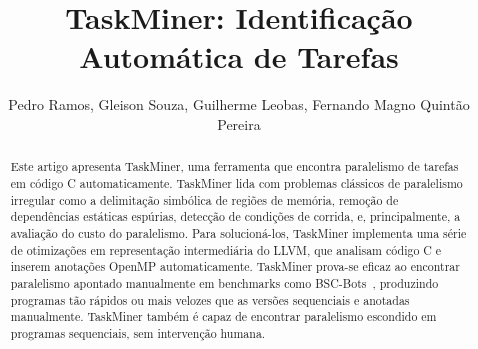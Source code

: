 \documentclass[sigplan,10pt]{acmart}
\newcommand\Taskminer{\mbox{\textsf{TaskMiner}}}
\begin{document}
\title[TaskMiner: Identifica\c{c}\~{a}o Autom\'{a}tica de Tarefas]
{TaskMiner: Identificação Automática de Tarefas}



\author{Pedro Ramos, Gleison Souza, Guilherme Leobas, Fernando Magno Quint\~{a}o Pereira}




\begin{abstract}
Este artigo apresenta \Taskminer{}, uma ferramenta que encontra paralelismo de tarefas
em código C automaticamente. \Taskminer{} lida com problemas clássicos de paralelismo irregular 
como a delimitação simbólica de regiões de memória, remoção de dependências
estáticas espúrias, detecção de condições de corrida, e, principalmente, a avaliação do custo do paralelismo. Para solucioná-los,
\Taskminer{} implementa uma série de otimizações em representa\-ção intermediária do LLVM, que analisam código C e inserem anotações OpenMP automaticamente. \Taskminer{} prova-se eficaz ao encontrar paralelismo apontado manualmente em benchmarks como \textsf{BSC-Bots}~\cite{Duran09}, produzindo programas tão rápidos ou mais velozes que as versões sequenciais e anotadas manualmente. \Taskminer{} também é capaz de encontrar paralelismo escondido em programas sequenciais, sem intervenção humana.
\end{abstract}
\end{document}
